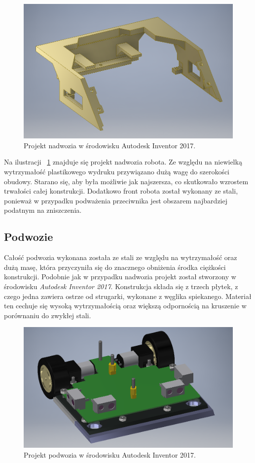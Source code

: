 \begin{figure}[H]
	\centering
		\includegraphics[width=0.75\linewidth]{pic04/body.png}
	\caption{Projekt nadwozia w środowisku Autodesk Inventor 2017.}
	\label{fig:body}	
\end{figure}

Na ilustracji ~\ref{fig:body} znajduje się projekt nadwozia robota. Ze względu na niewielką wytrzymałość plastikowego wydruku przywiązano dużą wagę do szerokości obudowy. Starano się, aby była możliwie jak najszersza, co skutkowało wzrostem trwałości całej konstrukcji. Dodatkowo front robota został wykonany ze stali, ponieważ w przypadku podważenia przeciwnika jest obszarem najbardziej podatnym na zniszczenia. 

\subsection{Podwozie}
Całość podwozia wykonana została ze stali ze względu na wytrzymałość oraz dużą masę, która przyczyniła się do znacznego obniżenia środka ciężkości konstrukcji.  Podobnie jak w przypadku nadwozia projekt został stworzony w środowisku \textit{Autodesk Inventor 2017}. Konstrukcja składa się z trzech płytek, z czego jedna zawiera ostrze od strugarki, wykonane z węglika spiekanego. Materiał ten cechuje się wysoką wytrzymałością oraz większą odpornością na kruszenie w porównaniu do zwykłej stali. 

\begin{figure}[H]
	\centering
		\includegraphics[width=0.75\linewidth]{pic04/chassis.png}
	\caption{Projekt podwozia w środowisku Autodesk Inventor 2017.}
	\label{fig:chassis}	
\end{figure}

